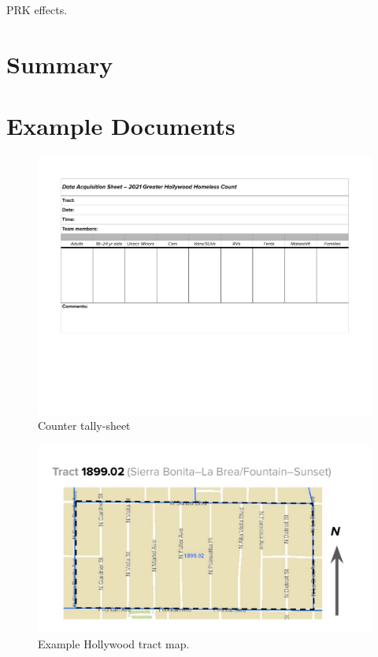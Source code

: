 \documentclass[11pt,twocolumn]{article}
\begin{document}
PRK effects.

\section{Summary}
\label{sec:summary}

\appendix

\section{Example Documents}

\begin{figure}
	\centering
	\includegraphics[width =\linewidth]{Hollywood2021CountDataSheet}
	\caption{Counter tally-sheet}
\end{figure}

\begin{figure}
	\centering
	\includegraphics[width =\linewidth]{tractMap}
	\caption{Example Hollywood tract map.}
\end{figure}
\end{document}
